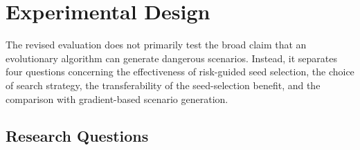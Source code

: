 \section{Experimental Design}
\label{sec:experimental_design}

The revised evaluation does not primarily test the broad claim that an evolutionary algorithm can generate dangerous scenarios. Instead, it separates four questions concerning the effectiveness of risk-guided seed selection, the choice of search strategy, the transferability of the seed-selection benefit, and the comparison with gradient-based scenario generation.

\subsection{Research Questions}
\label{sec:research_questions}

